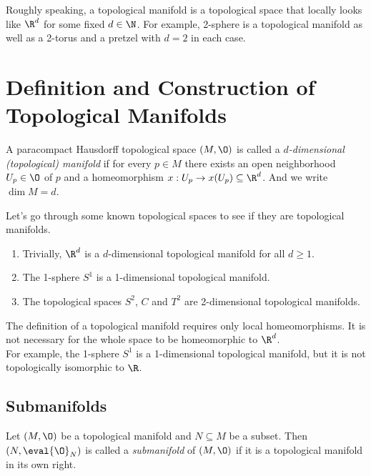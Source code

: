 
Roughly speaking, a topological manifold is a topological space that locally looks like \(\R^d\) for some fixed \(d \in \N\). For example, 2-sphere is a topological manifold as well as a 2-torus and a pretzel with \(d = 2\) in each case.

\section{Definition and Construction of Topological Manifolds}

\begin{definition}
	A paracompact Hausdorff topological space \((M, \O)\) is called a \emph{\(d\)-dimensional (topological) manifold} if for every \(p \in M\) there exists an open neighborhood \(U_p \in \O\) of \(p\) and a homeomorphism \(x: U_p \to x(U_p) \subseteq \R^d\). And we write \(\dim{M} = d\).
\end{definition}

\begin{example}
	Let's go through some known topological spaces to see if they are topological manifolds.
	\begin{enumerate}
		\item Trivially, \(\R^d\) is a \(d\)-dimensional topological manifold for all \(d \ge 1\).
		\item The 1-sphere \(S^1\) is a 1-dimensional topological manifold.
		\item The topological spaces \(S^2\), \(C\) and \(T^2\) are 2-dimensional topological manifolds.
	\end{enumerate}
\end{example}

\begin{remark}
	The definition of a topological manifold requires only local homeomorphisms. It is not necessary for the whole space to be homeomorphic to \(\R^d\). \\
	For example, the 1-sphere \(S^1\) is a 1-dimensional topological manifold, but it is not topologically isomorphic to \(\R\).
\end{remark}

\subsection{Submanifolds}

\begin{definition}[Submanifold]
	Let \((M, \O)\) be a topological manifold and \(N \subseteq M\) be a subset. Then \((N, \eval{\O}_N)\) is called a \emph{submanifold} of \((M, \O)\) if it is a topological manifold in its own right.
\end{definition}

